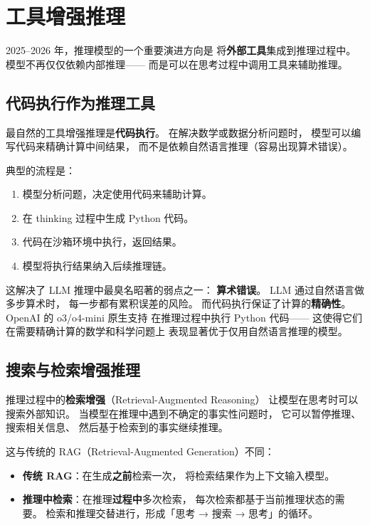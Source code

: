 \section{工具增强推理}

2025--2026 年，推理模型的一个重要演进方向是
将\textbf{外部工具}集成到推理过程中。
模型不再仅仅依赖内部推理——
而是可以在思考过程中调用工具来辅助推理。

\subsection{代码执行作为推理工具}

最自然的工具增强推理是\textbf{代码执行}。
在解决数学或数据分析问题时，
模型可以编写代码来精确计算中间结果，
而不是依赖自然语言推理（容易出现算术错误）。

典型的流程是：
\begin{enumerate}[noitemsep]
  \item 模型分析问题，决定使用代码来辅助计算。
  \item 在 thinking 过程中生成 Python 代码。
  \item 代码在沙箱环境中执行，返回结果。
  \item 模型将执行结果纳入后续推理链。
\end{enumerate}

这解决了 LLM 推理中最臭名昭著的弱点之一：
\textbf{算术错误}。
LLM 通过自然语言做多步算术时，
每一步都有累积误差的风险。
而代码执行保证了计算的\textbf{精确性}。
OpenAI 的 o3/o4-mini 原生支持
在推理过程中执行 Python 代码——
这使得它们在需要精确计算的数学和科学问题上
表现显著优于仅用自然语言推理的模型。

\subsection{搜索与检索增强推理}

推理过程中的\textbf{检索增强}（Retrieval-Augmented Reasoning）
让模型在思考时可以搜索外部知识。
当模型在推理中遇到不确定的事实性问题时，
它可以暂停推理、搜索相关信息、
然后基于检索到的事实继续推理。

这与传统的 RAG（Retrieval-Augmented Generation）不同：
\begin{itemize}[noitemsep]
  \item \textbf{传统 RAG}：在生成\textbf{之前}检索一次，
        将检索结果作为上下文输入模型。
  \item \textbf{推理中检索}：在推理\textbf{过程中}多次检索，
        每次检索都基于当前推理状态的需要。
        检索和推理交替进行，形成「思考 → 搜索 → 思考」的循环。
\end{itemize}

